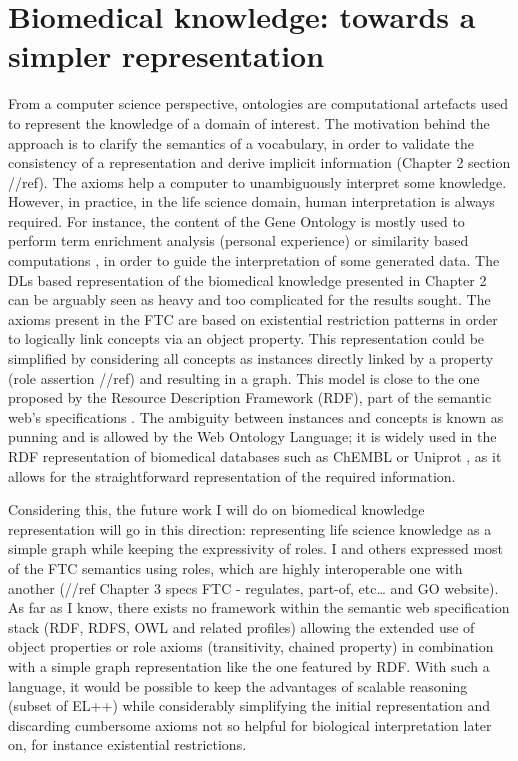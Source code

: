 \section{Biomedical knowledge: towards a simpler representation}
From a computer science perspective, ontologies are computational artefacts used to represent the knowledge of a domain of interest. The motivation behind the approach is to clarify the semantics of a vocabulary, in order to validate the consistency of a representation and derive implicit information (Chapter 2 section //ref). The axioms help a computer to unambiguously interpret some knowledge. However, in practice, in the life science domain, human interpretation is always required. For instance, the content of the Gene Ontology is mostly used to perform term enrichment analysis (personal experience) or similarity based computations \citep{pesquita2009semantic}, in order to guide the interpretation of some generated data. The DLs based representation of the biomedical knowledge presented in Chapter 2 can be arguably seen as heavy and too complicated for the results sought. The axioms present in the FTC are based on existential restriction patterns in order to logically link concepts via an object property. This representation could be simplified by considering all concepts as instances directly linked by a property (role assertion //ref) and resulting in a graph. This model is close to the one proposed by the Resource Description Framework (RDF), part of the semantic web’s specifications \citep{klyne2006resource}. The ambiguity between instances and concepts is known as punning and is allowed by the Web Ontology Language; it is widely used in the RDF representation of biomedical databases such as ChEMBL or Uniprot \citep{jupp2014ebi}, as it allows for the straightforward representation of the required information.

Considering this, the future work I will do on biomedical knowledge representation will go in this direction: representing life science knowledge as a simple graph while keeping the expressivity of roles. I and others expressed most of the FTC semantics using roles, which are highly interoperable one with another (//ref Chapter 3 specs FTC - regulates, part-of, etc… and GO website). As far as I know, there exists no framework within the semantic web specification stack (RDF, RDFS, OWL and related profiles) allowing the extended use of object properties or role axioms (transitivity, chained property) in combination with a simple graph representation like the one featured by RDF. With such a language, it would be possible to keep the advantages of scalable reasoning (subset of EL++) while considerably simplifying the initial representation and discarding cumbersome axioms not so helpful for biological interpretation later on, for instance existential restrictions.

